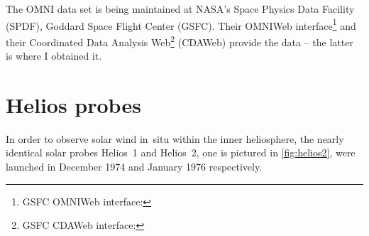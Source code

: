 The OMNI data set is being maintained at NASA's Space Physics Data Facility (SPDF), Goddard Space Flight Center (GSFC). Their OMNIWeb interface\footnote{GSFC OMNIWeb interface: } and their Coordinated Data Analysis Web\footnote{GSFC CDAWeb interface: } (CDAWeb) provide the data -- the latter is where I obtained it.


\section{Helios probes}
\label{sec:helios_probes}
In order to observe solar wind in~situ within the inner heliosphere, the nearly identical solar probes Helios~1 and Helios~2, one is pictured in \autoref{fig:helios2}, were launched in December 1974 and January 1976 respectively.
